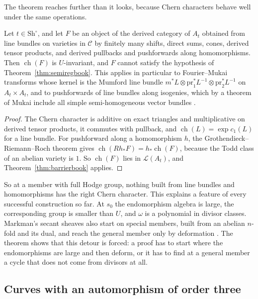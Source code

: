 The theorem reaches further than it looks, because Chern characters behave
well under the same operations.

\begin{corollary}\label{cor:barrierbook}
Let $t\in\mathrm{Sh}^{\circ}$, and let $F$ be an object of the derived category of
$A_{t}$ obtained from line bundles on varieties in $\mathcal C$ by finitely
many shifts, direct sums, cones, derived tensor products, and derived
pullbacks and pushforwards along homomorphisms. Then $\operatorname{ch}(F)$
is $U$-invariant, and $F$ cannot satisfy the hypothesis of
Theorem~\ref{thm:semiregbook}. This applies in particular to Fourier--Mukai
transforms whose kernel is the Mumford line bundle
$m^{*}L\otimes\mathrm{pr}_{1}^{*}L^{-1}\otimes\mathrm{pr}_{2}^{*}L^{-1}$ on
$A_{t}\times A_{t}$, and to pushforwards of line bundles along isogenies,
which by a theorem of Mukai include all simple semi-homogeneous vector
bundles \cite{Muk78}.
\end{corollary}

\begin{proof}
The Chern character is additive on exact triangles and multiplicative on
derived tensor products, it commutes with pullback, and
$\operatorname{ch}(L)=\exp c_{1}(L)$ for a line bundle. For pushforward
along a homomorphism $h$, the Grothendieck--Riemann--Roch theorem gives
$\operatorname{ch}(Rh_{*}F)=h_{*}\operatorname{ch}(F)$, because the Todd
class of an abelian variety is $1$. So $\operatorname{ch}(F)$ lies in
$\mathcal L(A_{t})$, and Theorem~\ref{thm:barrierbook} applies.
\end{proof}

So at a member with full Hodge group, nothing built from line bundles and
homomorphisms has the right Chern character. This explains a feature of
every successful construction so far. At $s_{0}$ the endomorphism algebra
is large, the corresponding group is smaller than $U$, and $\omega$ is a
polynomial in divisor classes. Markman's secant sheaves also start on
special members, built from an abelian $n$-fold and its dual, and reach the
general member only by deformation \cite{Mar25a,Mar25b}. The theorem shows
that this detour is forced: a proof has to start where the endomorphisms
are large and then deform, or it has to find at a general member a cycle
that does not come from divisors at all.

\subsection{Curves with an automorphism of order three}

